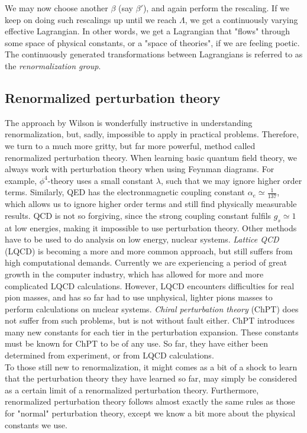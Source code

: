 \documentclass[10pt,twoside]{report}
\begin{document}
	We may now choose another $\beta$ (say $\beta'$), and again perform the rescaling. If we keep on doing such rescalings up until we reach $\Lambda$, we get a continuously varying effective Lagrangian. In other words, we get a Lagrangian that "flows" through some space of physical constants, or a "space of theories", if we are feeling poetic. The continuously generated transformations between Lagrangians is referred to as the \emph{renormalization group}.
	
	\subsection{Renormalized perturbation theory}
	The approach by Wilson is wonderfully instructive in understanding renormalization, but, sadly, impossible to apply in practical problems. Therefore, we turn to a much more gritty, but far more powerful, method called renormalized perturbation theory. When learning basic quantum field theory, we always work with perturbation theory when using Feynman diagrams. For example, $\phi^4$-theory uses a small constant $\lambda$, such that we may ignore higher order terms. Similarly, QED has the electronmagnetic coupling constant $\alpha_e \simeq \frac{1}{137}$, which allows us to ignore higher order terms and still find physically measurable results. QCD is not so forgiving, since the strong coupling constant fulfils $g_s \simeq 1$ at low energies, making it impossible to use perturbation theory. Other methods have to be used to do analysis on low energy, nuclear systems. \emph{Lattice QCD} (LQCD) is becoming a more and more common approach, but still suffers from high computational demands. Currently we are experiencing a period of great growth in the computer industry, which has allowed for more and more complicated LQCD calculations. However, LQCD encounters difficulties for real pion masses, and has so far had to use unphysical, lighter pions masses to perform calculations on nuclear systems. \emph{Chiral perturbation theory} (ChPT) does not suffer from such problems, but is not without fault either. ChPT introduces many new constants for each tier in the perturbation expansion. These constants must be known for ChPT to be of any use. So far, they have either been determined from experiment, or from LQCD calculations.\\
	
	To those still new to renormalization, it might comes as a bit of a shock to learn that the perturbation theory they have learned so far, may simply be considered as a certain limit of a renormalized perturbation theory. Furthermore, renormalized perturbation theory follows almost exactly the same rules as those for "normal" perturbation theory, except we know a bit more about the physical constants we use.\\
	
\end{document}
